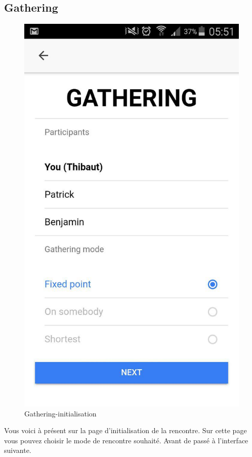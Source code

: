 \documentclass[french]{article}
\begin{document}
	\subsection{Gathering}
	\begin{figure}[H]
		\centering
		\includegraphics[scale=0.4]{../screenshot/screenshot-gathering-init}
		\caption{Gathering-initialisation}
		\label{Gathering-initialisation}
	\end{figure} 
	Vous voici à présent sur la page d'initialisation de la rencontre. Sur cette page vous pouvez choisir le mode de rencontre souhaité. Avant de passé à l'interface suivante.
\end{document}
